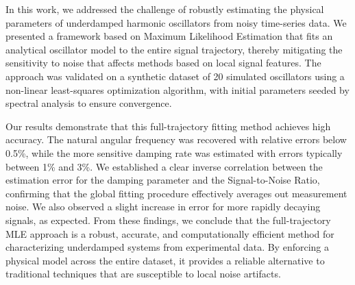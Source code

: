 \documentclass[]{article}
\begin{document}
In this work, we addressed the challenge of robustly estimating the physical parameters of underdamped harmonic oscillators from noisy time-series data. We presented a framework based on Maximum Likelihood Estimation that fits an analytical oscillator model to the entire signal trajectory, thereby mitigating the sensitivity to noise that affects methods based on local signal features. The approach was validated on a synthetic dataset of 20 simulated oscillators using a non-linear least-squares optimization algorithm, with initial parameters seeded by spectral analysis to ensure convergence.

Our results demonstrate that this full-trajectory fitting method achieves high accuracy. The natural angular frequency was recovered with relative errors below 0.5\%, while the more sensitive damping rate was estimated with errors typically between 1\% and 3\%. We established a clear inverse correlation between the estimation error for the damping parameter and the Signal-to-Noise Ratio, confirming that the global fitting procedure effectively averages out measurement noise. We also observed a slight increase in error for more rapidly decaying signals, as expected. From these findings, we conclude that the full-trajectory MLE approach is a robust, accurate, and computationally efficient method for characterizing underdamped systems from experimental data. By enforcing a physical model across the entire dataset, it provides a reliable alternative to traditional techniques that are susceptible to local noise artifacts.
\end{document}
